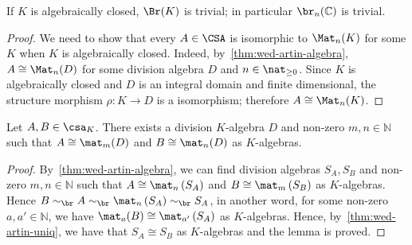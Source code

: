 \begin{theorem}
  \label{thm:br-triv-alg-closed}
  If $K$ is algebraically closed, $\Br(K)$ is trivial; in particular $\br_{n}(\mathbb{C})$ is trivial.
  \leanok
\end{theorem}
\begin{proof}
  We need to show that every $A\in\CSA$ is isomorphic to $\Mat_{n}(K)$ for some $K$ when $K$ is algebraically closed. Indeed, by~\cref{thm:wed-artin-algebra}, $A \cong \Mat_{n}(D)$ for some division algebra $D$ and $n\in\nat_{\ge0}$. Since $K$ is algebraically closed and $D$ is an integral domain and finite dimensional, the structure morphism $\rho: K\to D$ is a isomorphism; therefore $A\cong \Mat_{n}(K)$.
\end{proof}

\begin{lemma}
  \label{lem:common-div-alg}
Let $A, B \in \csa_{K}$. There exists a division $K$-algebra $D$ and non-zero $m,n\in\mathbb{N}$ such that $A\cong\mat_{m}(D)$ and $B\cong\mat_{n}(D)$ as $K$-algebras.
  \leanok
\end{lemma}

\begin{proof}
  By~\cref{thm:wed-artin-algebra}, we can find division algebras $S_{A}, S_{B}$ and non-zero $m, n\in\mathbb{N}$ such that $A\cong\mat_{n}\left(S_{A}\right)$ and $B\cong\mat_{m}\left(S_{B}\right)$ as $K$-algebras. Hence $B\sim_{\br}A\sim_{\br}\mat_{n}\left(S_{A}\right)\sim_{\br}S_{A}$, in another word, for some non-zero $a, a'\in\mathbb{N}$, we have $\mat_{a}(B)\cong\mat_{a'}\left(S_{A}\right)$ as $K$-algebras. Hence, by~\cref{thm:wed-artin-uniq}, we have that $S_{A}\cong S_{B}$ as $K$-algebras and the lemma is proved.
\end{proof}

